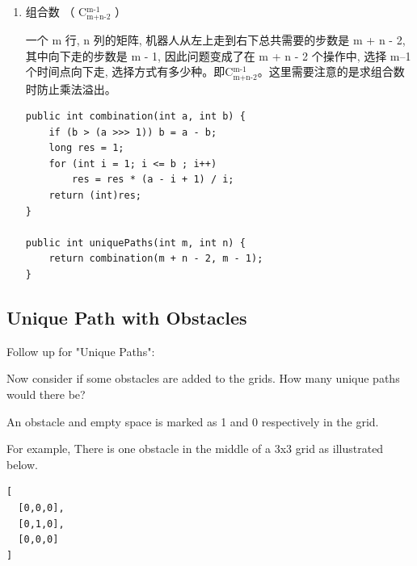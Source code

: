 \documentclass[12pt]{book}
\begin{document}
\begin{enumerate}
\begin{lstlisting}
    int [][] dp = new int[m][n];
    for (int i = 0; i < n; i++) 
        dp[0][i] = 1;
    for (int i = 0; i < m; i++)
        dp[i][0] = 1;
    dp[0][0] = 0;
    for (int i = 1; i < m; i++) 
        for (int j = 1; j < n; j++) 
            dp[i][j] = dp[i][j - 1] + dp[i - 1][j];
    return dp[m-1][n-1];
}
\end{lstlisting}

滚动数组
\lstset{language=java,label= ,caption= ,numbers=none}
\begin{lstlisting}
// 动规,滚动数组
// 时间复杂度 O(n^2), 空间复杂度 O(n)
int uniquePaths(int m, int n) {
    vector<int> f(n, 0);
    f[0] = 1;
    for (int i = 0; i < m; i++) {
        for (int j = 1; j < n; j++) {
            // 左边的 f[j], 表示更新后的 f[j], 与公式中的 f[i[[j] 对应
            // 右边的 f[j], 表示老的 f[j], 与公式中的 f[i-1][j] 对应
            f[j] = f[j - 1] + f[j];
        }
    }
    return f[n - 1];
}
\end{lstlisting}

\item 组合数 （ C$_{\text{m+n-2}}^{\text{m-1}}$ ）
\label{sec-14-2-1-4}

一个 m 行, n 列的矩阵, 机器人从左上走到右下总共需要的步数是 m + n - 2, 其中向下走的步数是 m - 1, 因此问题变成了在 m + n - 2 个操作中, 选择 m–1 个时间点向下走, 选择方式有多少种。即C$_{\text{m+n-2}}^{\text{m-1}}$。这里需要注意的是求组合数时防止乘法溢出。
\lstset{language=java,label= ,caption= ,numbers=none}
\begin{lstlisting}
public int combination(int a, int b) {
    if (b > (a >>> 1)) b = a - b;
    long res = 1;
    for (int i = 1; i <= b ; i++) 
        res = res * (a - i + 1) / i;
    return (int)res;
}
        
public int uniquePaths(int m, int n) {
    return combination(m + n - 2, m - 1);
}
\end{lstlisting}
\end{enumerate}

\subsection{Unique Path with Obstacles}
\label{sec-14-2-2}
Follow up for "Unique Paths":

Now consider if some obstacles are added to the grids. How many unique paths would there be?

An obstacle and empty space is marked as 1 and 0 respectively in the grid.

For example, There is one obstacle in the middle of a 3x3 grid as illustrated below.
\lstset{language=java,label= ,caption= ,numbers=none}
\begin{lstlisting}
[
  [0,0,0],
  [0,1,0],
  [0,0,0]
]
\end{lstlisting}
\end{document}
